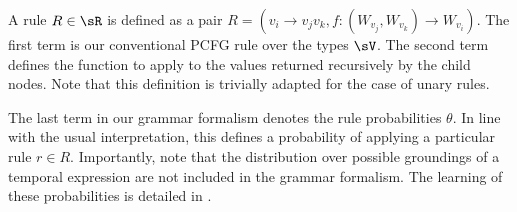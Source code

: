A rule $R \in \sR$ is defined as a pair 
	$R = \left(v_i \rightarrow v_jv_k, 
		f : (W_{v_j},W_{v_k}) \rightarrow W_{v_i}\right)$.
The first term is our conventional PCFG rule over the types $\sV$.
The second term defines the function to apply to the values returned
	recursively by the child nodes.
Note that this definition is trivially adapted for the case of unary rules.

The last term in our grammar formalism denotes the rule probabilities $\theta$.
In line with the usual interpretation, this defines a probability
	of applying a particular rule $r \in R$.
Importantly, note that the distribution over possible groundings
	of a temporal expression are not included in the grammar
	formalism.
The learning of these probabilities is detailed in .


